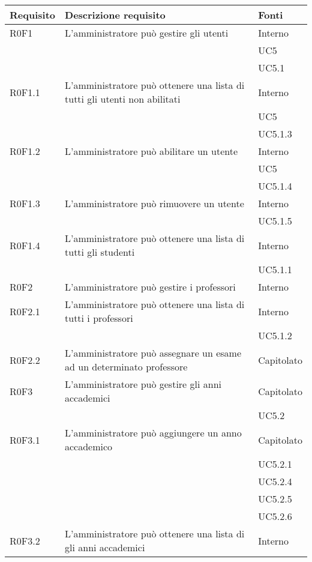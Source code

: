 \documentclass[AnalisiDeiRequisiti.tex]{subfiles}
\begin{document}
\label{table:Tabella di tracciamento requisiti-fonti}
\begin{longtable}[H]{|p{2cm}|p{5cm}|p{5cm}|}
	\hline
	\rowcolor[HTML]{38FFF8} 
	\textbf{Requisito} & \textbf{Descrizione requisito} & \textbf{Fonti} \\ \hline
	\endhead
	R0F1 &  L'amministratore può gestire gli utenti & Interno \\ 
	& & UC5 \\  
	& & UC5.1 \\ \hline
	R0F1.1 &  L'amministratore può ottenere una lista di tutti gli utenti non abilitati & Interno \\ 
	& & UC5 \\  
	& & UC5.1.3 \\ \hline
	R0F1.2 &  L'amministratore può abilitare un utente & Interno \\ 
	& & UC5 \\ 
	& & UC5.1.4 \\   \hline
	R0F1.3 &  L'amministratore può rimuovere un utente & Interno \\ 
	& & UC5.1.5 \\ \hline
	R0F1.4 &  L'amministratore può ottenere una lista di tutti gli studenti & Interno \\  
	& & UC5.1.1 \\ \hline
	R0F2 &  L'amministratore può gestire i professori & Interno \\ \hline
	R0F2.1 &  L'amministratore può ottenere una lista di tutti i professori & Interno \\ 
	& & UC5.1.2 \\  \hline
	R0F2.2 &  L'amministratore può assegnare un esame ad un determinato professore & Capitolato \\ \hline
	R0F3 &  L'amministratore può gestire gli anni accademici & Capitolato \\ 
	& & UC5.2 \\ \hline
	R0F3.1 &  L'amministratore può aggiungere un anno accademico & Capitolato \\ 
	& & UC5.2.1 \\ 
	& & UC5.2.4 \\ 
	& & UC5.2.5 \\ 
	& & UC5.2.6 \\ \hline
	R0F3.2 &  L'amministratore può ottenere una lista di gli anni accademici & Interno \\ 

\end{longtable}
\end{document}
